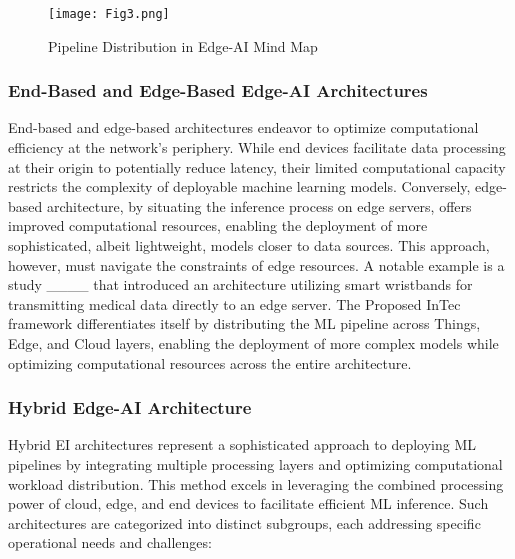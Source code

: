 	\begin{figure}[h]
		\centering
		\texttt{[image: Fig3.png]}
		\caption{Pipeline Distribution in Edge-AI Mind Map}
	\end{figure}
	
	\subsubsection{End-Based and Edge-Based Edge-AI Architectures}
	End-based and edge-based architectures endeavor to optimize computational efficiency at the network's periphery. While end devices facilitate data processing at their origin to potentially reduce latency, their limited computational capacity restricts the complexity of deployable machine learning models. Conversely, edge-based architecture, by situating the inference process on edge servers, offers improved computational resources, enabling the deployment of more sophisticated, albeit lightweight, models closer to data sources. This approach, however, must navigate the constraints of edge resources. A notable example is a study ____ that introduced an architecture utilizing smart wristbands for transmitting medical data directly to an edge server. The Proposed InTec framework differentiates itself by
	distributing the ML pipeline across Things, Edge, and Cloud layers, enabling the
	deployment of more complex models while optimizing computational resources
	across the entire architecture.
	
	\subsubsection{Hybrid Edge-AI Architecture}
	Hybrid EI architectures represent a sophisticated approach to deploying ML pipelines by integrating multiple processing layers and optimizing computational workload distribution. This method excels in leveraging the combined processing power
	of cloud, edge, and end devices to facilitate efficient ML inference. Such architectures are categorized into distinct subgroups, each addressing specific operational
	needs and challenges:
	
